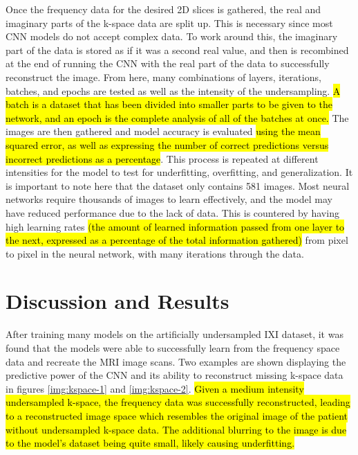 \documentclass[14pt]{extreport}
\begin{document}
        Once the frequency data for the desired 2D slices is gathered, the real and imaginary parts of the k-space data are split up. This is necessary since most CNN models do not accept complex data. To work around this, the imaginary part of the data is stored as if it was a second real value, and then is recombined at the end of running the CNN with the real part of the data to successfully reconstruct the image. From here, many combinations of layers, iterations, batches, and epochs are tested as well as the intensity of the undersampling. \hl{A batch is a dataset that has been divided into smaller parts to be given to the network, and an epoch is the complete analysis of all of the batches at once.} The images are then gathered and model accuracy is evaluated \hl{using the mean squared error, as well as expressing the number of correct predictions versus incorrect predictions as a percentage}. This process is repeated at different intensities for the model to test for underfitting, overfitting, and generalization. It is important to note here that the dataset only contains 581 images. Most neural networks require thousands of images to learn effectively, and the model may have reduced performance due to the lack of data. This is countered by having high learning rates \hl{(the amount of learned information passed from one layer to the next, expressed as a percentage of the total information gathered)} from pixel to pixel in the neural network, with many iterations through the data.

    \section*{Discussion and Results}
        After training many models on the artificially undersampled IXI dataset, it was found that the models were able to successfully learn from the frequency space data and recreate the MRI image scans. Two examples are shown displaying the predictive power of the CNN and its ability to reconstruct missing k-space data in figures \ref{img:kspace-1} and \ref{img:kspace-2}. \hl{Given a medium intensity undersampled k-space, the frequency data was successfully reconstructed, leading to a reconstructed image space which resembles the original image of the patient without undersampled k-space data. The additional blurring to the image is due to the model's dataset being quite small, likely causing underfitting.}
\end{document}
